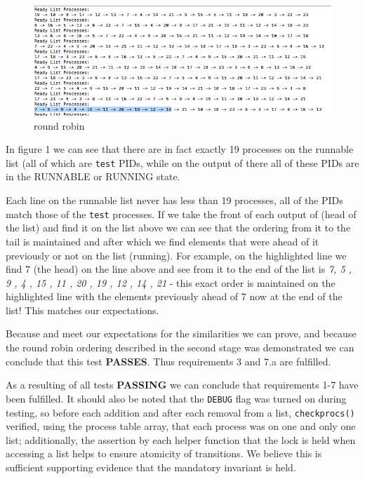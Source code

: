 \documentclass[11pt,letterpaper]{report}
\begin{document}
\begin{figure}[h]
\centering
\includegraphics[width=0.8\linewidth]{rr-2.png}
\caption{round robin}
\label{fig:1}
\end{figure}

\pagebreak

In figure 1 we can see that there are in fact exactly 19 processes on the runnable list (all of which are {\tt test} PIDs, while on the output of  there all of these PIDs are in the RUNNABLE or RUNNING state.

Each line on the runnable list never has less than 19 processes, all of the PIDs match those of the {\tt test} processes. If we take the front of each output of  (head of the list) and find it on the list above we can see that
the ordering from it to the tail is maintained and after which we find elements that were ahead of it previously or not on the list (running). For example, on the highlighted line we find 7 (the head) on the line above and see from it to the end of the list is 
\emph{7, 5 , 9 , 4 , 15 , 11 , 20 , 19 , 12 , 14 , 21} - this exact order is maintained on the highlighted line with the elements previously ahead of 7 now at the end of the list! This matches our expectations.

Because  and  meet our expectations for the similarities we can prove, and because the round robin ordering described in the second stage was demonstrated we can conclude that this test \textbf{PASSES}. Thus
requirements 3 and 7.a are fulfilled.


As a resulting of all tests \textbf{PASSING} we can conclude that requirements 1-7 have been fulfilled. It should also be noted that the {\tt DEBUG} flag was turned on during testing, so before 
each addition and after each removal from a list, {\tt checkprocs()} verified, using the process table array, that each process was on one and only one list; additionally, the assertion by each helper
function that the lock is held when accessing a list helps to ensure atomicity of transitions. We believe this is sufficient supporting evidence that the mandatory invariant is held.
\end{document}
